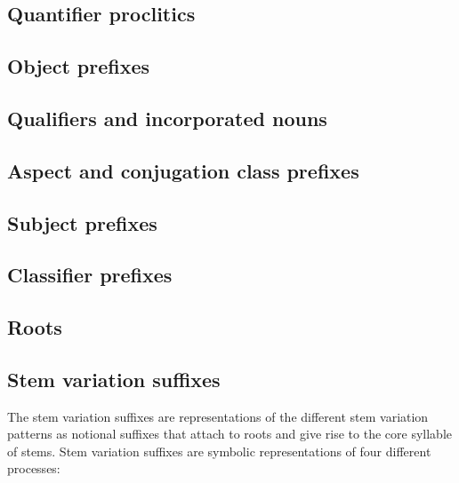 \subsection{Quantifier proclitics}\label{sec:inventory-qfr}

\subsection{Object prefixes}\label{sec:inventory-object}

\subsection{Qualifiers and incorporated nouns}\label{sec:inventory-qualinc}

\subsection{Aspect and conjugation class prefixes}\label{sec:inventory-aspconj}

\subsection{Subject prefixes}\label{sec:inventory-subject}

\subsection{Classifier prefixes}\label{sec:inventory-classifier}

\subsection{Roots}\label{sec:inventory-root}

\subsection{Stem variation suffixes}\label{sec:inventory-stemvar}

The stem variation suffixes are representations of the different stem variation patterns
as notional suffixes that attach to roots and give rise to the core syllable of stems.
Stem variation suffixes are symbolic representations of four different processes:

